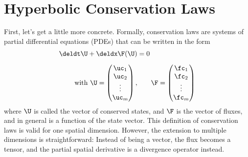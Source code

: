\chapter{Hyperbolic Conservation Laws}

First, let's get a little more concrete.
Formally, conservation laws are systems of partial differential equations (PDEs) that can be
written in the form
%
\begin{align}
  \deldt \U + \deldx \F(\U) &= 0 \\[.5em] \label{eq:conservation-law-1D-introduction}
  \text{with } \U = \left( \begin{matrix}
                    \uc_1 \\ \uc_2 \\ \vdots \\ \uc_m \\
                    \end{matrix} \right), & \quad \quad
                \F =\left( \begin{matrix}
                    \fc_1 \\ \fc_2 \\ \vdots \\ \fc_m \\
                    \end{matrix} \right)
\end{align}
%
where $\U$ is called the vector of conserved states, and $\F$ is the vector of fluxes, and in
general is a function of the state vector. This definition of conservation laws is valid for one
spatial dimension. However, the extension to multiple dimensions is straightforward: Instead of
being a vector, the flux becomes a tensor, and the partial spatial derivative is a divergence
operator instead.

